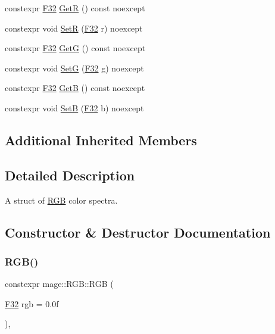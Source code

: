 \begin{DoxyCompactItemize}
constexpr \mbox{\hyperlink{namespacemage_aa97e833b45f06d60a0a9c4fc22ae02c0}{F32}} \mbox{\hyperlink{structmage_1_1_r_g_b_a314530cf81692c9f49da663ba51ea528}{GetR}} () const noexcept
\item 
constexpr void \mbox{\hyperlink{structmage_1_1_r_g_b_a1fc1a5b272202fb56f3a8f35735836d2}{SetR}} (\mbox{\hyperlink{namespacemage_aa97e833b45f06d60a0a9c4fc22ae02c0}{F32}} r) noexcept
\item 
constexpr \mbox{\hyperlink{namespacemage_aa97e833b45f06d60a0a9c4fc22ae02c0}{F32}} \mbox{\hyperlink{structmage_1_1_r_g_b_a997a18a9af34e5796d18974762574faf}{GetG}} () const noexcept
\item 
constexpr void \mbox{\hyperlink{structmage_1_1_r_g_b_a6a47f8186e29e29a9d253732e7071ed7}{SetG}} (\mbox{\hyperlink{namespacemage_aa97e833b45f06d60a0a9c4fc22ae02c0}{F32}} g) noexcept
\item 
constexpr \mbox{\hyperlink{namespacemage_aa97e833b45f06d60a0a9c4fc22ae02c0}{F32}} \mbox{\hyperlink{structmage_1_1_r_g_b_a5a48ef39436290969ed01021bdbb687d}{GetB}} () const noexcept
\item 
constexpr void \mbox{\hyperlink{structmage_1_1_r_g_b_a363d6235bc2c68907addb5326df07dc7}{SetB}} (\mbox{\hyperlink{namespacemage_aa97e833b45f06d60a0a9c4fc22ae02c0}{F32}} b) noexcept
\end{DoxyCompactItemize}
\subsection*{Additional Inherited Members}


\subsection{Detailed Description}
A struct of \mbox{\hyperlink{structmage_1_1_r_g_b}{R\+GB}} color spectra. 

\subsection{Constructor \& Destructor Documentation}
\mbox{\label{structmage_1_1_r_g_b_a166d2c13b46f9518c132c68f1117e5c6}} 
\subsubsection{\texorpdfstring{R\+G\+B()}{RGB()}\hspace{0.1cm}{\footnotesize\ttfamily [1/7]}}
{\footnotesize\ttfamily constexpr mage\+::\+R\+G\+B\+::\+R\+GB (\begin{DoxyParamCaption}\item[{\mbox{\hyperlink{namespacemage_aa97e833b45f06d60a0a9c4fc22ae02c0}{F32}}}]{rgb = {\ttfamily 0.0f} }\end{DoxyParamCaption})\hspace{0.3cm}{\ttfamily [explicit]}, {\ttfamily [noexcept]}}

